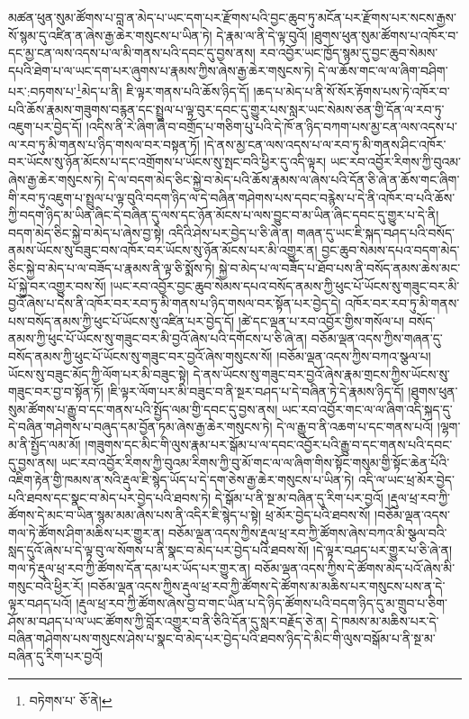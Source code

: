 མཚན་ཕུན་སུམ་ཚོགས་པ་བླ་ན་མེད་པ་ཡང་དག་པར་རྫོགས་པའི་བྱང་ཆུབ་ཏུ་མངོན་པར་རྫོགས་པར་སངས་རྒྱས་སོ་སྙམ་དུ་འཛིན་ན་ཞེས་རྒྱ་ཆེར་གསུངས་པ་ཡིན་ཏེ། དེ་རྣམ་ལ་ནི་དེ་ལྟ་བུའོ། །ཐུགས་ཕུན་སུམ་ཚོགས་པ་འཁོར་བ་དང་མྱ་ངན་ལས་འདས་པ་ལ་མི་གནས་པའི་དབང་དུ་བྱས་ནས། རབ་འབྱོར་ཡང་ཁྱོད་སྙམ་དུ་བྱང་ཆུབ་སེམས་དཔའི་ཐེག་པ་ལ་ཡང་དག་པར་ཞུགས་པ་རྣམས་ཀྱིས་ཞེས་རྒྱ་ཆེར་གསུངས་ཏེ། དེ་ལ་ཆོས་གང་ལ་ལ་ཞིག་བཤིག་པར་:བཏགས་པ་\footnote{བཏེགས་པ་  ཅོ་ནེ། }མེད་པ་ནི། ཇི་ལྟར་གནས་པའི་ཆོས་ཉིད་དོ། །ཆད་པ་མེད་པ་ནི་སོ་སོར་རྟོགས་པས་ཏེ་འཁོར་བ་པའི་ཆོས་རྣམས་གཟུགས་བརྙན་དང་སྤྲུལ་པ་ལྟ་བུར་དབང་དུ་གྱུར་པས་སླར་ཡང་སེམས་ཅན་གྱི་དོན་ལ་རབ་ཏུ་འཇུག་པར་བྱེད་དོ། །འདིས་ནི་རེ་ཞིག་ཞི་བ་བགྲོད་པ་གཅིག་པུ་པའི་དེ་ཁོ་ན་ཉིད་བཀག་པས་མྱ་ངན་ལས་འདས་པ་ལ་རབ་ཏུ་མི་གནས་པ་ཉིད་གསལ་བར་བསྟན་ཏོ། །དེ་ནས་མྱ་ངན་ལས་འདས་པ་ལ་རབ་ཏུ་མི་གནས་ཤིང་འཁོར་བར་ཡོངས་སུ་ཉོན་མོངས་པ་དང་འགྲོགས་པ་ཡོངས་སུ་སྤང་བའི་ཕྱིར་དུ་འདི་ལྟར། ཡང་རབ་འབྱོར་རིགས་ཀྱི་བུའམ་ཞེས་རྒྱ་ཆེར་གསུངས་ཏེ། དེ་ལ་བདག་མེད་ཅིང་སྐྱེ་བ་མེད་པའི་ཆོས་རྣམས་ལ་ཞེས་པའི་དོན་ཅི་ཞེ་ན་ཆོས་གང་ཞིག་གི་རབ་ཏུ་འཇུག་པ་སྤྲུལ་པ་ལྟ་བུའི་བདག་ཉིད་ལ་དེ་བཞིན་གཤེགས་པས་དབང་བརྙེས་པ་དེ་ནི་འཁོར་བ་པའི་ཆོས་ཀྱི་བདག་ཉིད་མ་ཡིན་ཞིང་དེ་བཞིན་དུ་ལས་དང་ཉོན་མོངས་པ་ལས་བྱུང་བ་མ་ཡིན་ཞིང་དབང་དུ་གྱུར་པ་དེ་ནི། བདག་མེད་ཅིང་སྐྱེ་བ་མེད་པ་ཞེས་བྱ་སྟེ། འདིའི་ཤེས་པར་བྱེད་པ་ཅི་ཞེ་ན། གཞན་དུ་ཡང་ཇི་སྐད་བཤད་པའི་བསོད་ནམས་ཡོངས་སུ་བཟུང་བས་འཁོར་བར་ཡོངས་སུ་ཉོན་མོངས་པར་མི་འགྱུར་ན། བྱང་ཆུབ་སེམས་དཔའ་བདག་མེད་ཅིང་སྐྱེ་བ་མེད་པ་ལ་བཟོད་པ་རྣམས་ནི་ལྟ་ཅི་སྨོས་ཏེ། སྐྱེ་བ་མེད་པ་ལ་བཟོད་པ་ཐོབ་པས་ནི་བསོད་ནམས་ཆེས་མང་པོ་སྐྱེ་བར་འགྱུར་བས་སོ། །ཡང་རབ་འབྱོར་བྱང་ཆུབ་སེམས་དཔའ་བསོད་ནམས་ཀྱི་ཕུང་པོ་ཡོངས་སུ་གཟུང་བར་མི་བྱའོ་ཞེས་པ་དེས་ནི་འཁོར་བར་རབ་ཏུ་མི་གནས་པ་ཉིད་གསལ་བར་སྟོན་པར་བྱེད་དེ། འཁོར་བར་རབ་ཏུ་མི་གནས་པས་བསོད་ནམས་ཀྱི་ཕུང་པོ་ཡོངས་སུ་འཛིན་པར་བྱེད་དོ། །ཚེ་དང་ལྡན་པ་རབ་འབྱོར་གྱིས་གསོལ་པ། བསོད་ནམས་ཀྱི་ཕུང་པོ་ཡོངས་སུ་གཟུང་བར་མི་བྱའོ་ཞེས་པའི་དགོངས་པ་ཅི་ཞེ་ན། བཅོམ་ལྡན་འདས་ཀྱིས་གཞན་དུ་བསོད་ནམས་ཀྱི་ཕུང་པོ་ཡོངས་སུ་གཟུང་བར་བྱའོ་ཞེས་གསུངས་སོ། །བཅོམ་ལྡན་འདས་ཀྱིས་བཀའ་སྩལ་པ། ཡོངས་སུ་བཟུང་མོད་ཀྱི་ལོག་པར་མི་བཟུང་སྟེ། དེ་ནས་ཡོངས་སུ་གཟུང་བར་བྱའོ་ཞེས་རྣམ་གྲངས་ཀྱིས་ཡོངས་སུ་གཟུང་བར་བྱ་བ་སྟོན་ཏོ། །ཇི་ལྟར་ལོག་པར་མི་བཟུང་བ་ནི་སྔར་བཤད་པ་དེ་བཞིན་ཏེ་དེ་རྣམས་ཉིད་དོ། །ཐུགས་ཕུན་སུམ་ཚོགས་པ་རྒྱུ་བ་དང་གནས་པའི་སྤྱོད་ལམ་གྱི་དབང་དུ་བྱས་ནས། ཡང་རབ་འབྱོར་གང་ལ་ལ་ཞིག་འདི་སྐད་དུ་དེ་བཞིན་གཤེགས་པ་བཞུད་དམ་བྱོན་ཏམ་ཞེས་རྒྱ་ཆེར་གསུངས་ཏེ། དེ་ལ་རྒྱུ་བ་ནི་འཆག་པ་དང་གནས་པའོ། །ལྷག་མ་ནི་སྤྱོད་ལམ་མོ། །གཟུགས་དང་མིང་གི་ལུས་རྣམ་པར་སྒོམ་པ་ལ་དབང་འབྱོར་པའི་རྒྱུ་བ་དང་གནས་པའི་དབང་དུ་བྱས་ནས། ཡང་རབ་འབྱོར་རིགས་ཀྱི་བུའམ་རིགས་ཀྱི་བུ་མོ་གང་ལ་ལ་ཞིག་གིས་སྟོང་གསུམ་གྱི་སྟོང་ཆེན་པོའི་འཇིག་རྟེན་གྱི་ཁམས་ན་སའི་རྡུལ་ཇི་སྙེད་ཡོད་པ་དེ་དག་ཅེས་རྒྱ་ཆེར་གསུངས་པ་ཡིན་ཏེ། འདི་ལ་ཡང་ཕྲ་མོར་བྱེད་པའི་ཐབས་དང་སྣང་བ་མེད་པར་བྱེད་པའི་ཐབས་ཏེ། དེ་སྒོམ་པ་ནི་སྔ་མ་བཞིན་དུ་རིག་པར་བྱའོ། །རྡུལ་ཕྲ་རབ་ཀྱི་ཚོགས་དེ་མང་བ་ཡིན་སྙམ་མམ་ཞེས་པས་ནི་འདིར་ཇི་སྙེད་པ་སྟེ། ཕྲ་མོར་བྱེད་པའི་ཐབས་སོ། །བཅོམ་ལྡན་འདས་གལ་ཏེ་ཚོགས་ཤིག་མཆིས་པར་གྱུར་ན། བཅོམ་ལྡན་འདས་ཀྱིས་རྡུལ་ཕྲ་རབ་ཀྱི་ཚོགས་ཞེས་བཀའ་མི་སྩལ་བའི་སླད་དུའོ་ཞེས་པ་དེ་ལྟ་བུ་ལ་སོགས་པ་ནི་སྣང་བ་མེད་པར་བྱེད་པའི་ཐབས་སོ། །དེ་ལྟར་བཤད་པར་གྱུར་པ་ཅི་ཞེ་ན། གལ་ཏེ་རྡུལ་ཕྲ་རབ་ཀྱི་ཚོགས་དོན་དམ་པར་ཡོད་པར་གྱུར་ན། བཅོམ་ལྡན་འདས་ཀྱིས་དེ་ཚོགས་མེད་པའོ་ཞེས་མི་གསུང་བའི་ཕྱིར་རོ། །བཅོམ་ལྡན་འདས་ཀྱིས་རྡུལ་ཕྲ་རབ་ཀྱི་ཚོགས་དེ་ཚོགས་མ་མཆིས་པར་གསུངས་པས་ན་དེ་ལྟར་བཤད་པའོ། །རྡུལ་ཕྲ་རབ་ཀྱི་ཚོགས་ཞེས་བྱ་བ་གང་ཡིན་པ་དེ་ཉིད་ཚོགས་པའི་བདག་ཉིད་དུ་མ་གྲུབ་པ་ཅིག་ཤོས་མ་བཤད་པ་ལ་ཡང་ཚོགས་ཀྱི་བློར་འགྱུར་བ་ནི་ཅིའི་དོན་དུ་སླར་བརྗོད་ཅེ་ན། དེ་ཁམས་མ་མཆིས་པར་དེ་བཞིན་གཤེགས་པས་གསུངས་ཤེས་པ་སྣང་བ་མེད་པར་བྱེད་པའི་ཐབས་ཉིད་དེ་མིང་གི་ལུས་བསྒོམ་པ་ནི་སྔ་མ་བཞིན་དུ་རིག་པར་བྱའོ། 